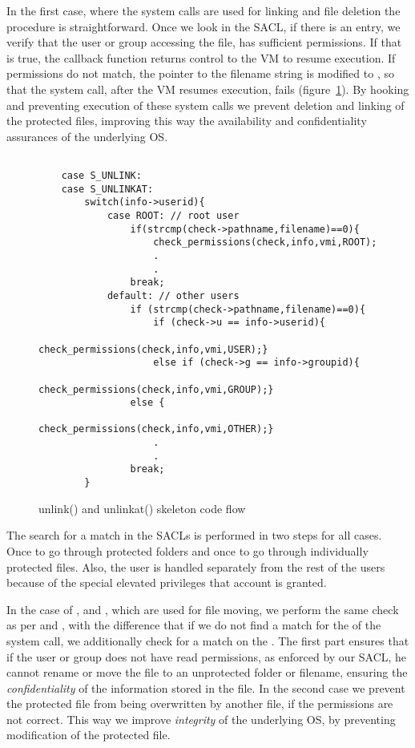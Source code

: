 \par In the first case, where the system calls are used for linking and file deletion the procedure is straightforward. Once we look in the \ac{SACL}, if there is an entry, we verify that the user or group accessing the file, has sufficient permissions. If that is true, the callback function returns control to the \ac{VM} to resume execution. If permissions do not match, the pointer to the filename string is modified to , so that the system call, after the \ac{VM} resumes execution, fails (figure~\ref{fig:unlink}). By hooking and preventing execution of these system calls we prevent deletion and linking of the protected files, improving this way the availability and confidentiality assurances of the underlying \ac{OS}.

\begin{figure}[ht]
\selectfont
\begin{lstlisting}[style=CStyle]

	case S_UNLINK:
	case S_UNLINKAT:
		switch(info->userid){
			case ROOT: // root user
				if(strcmp(check->pathname,filename)==0){
					check_permissions(check,info,vmi,ROOT);			
					.
					.
				break;
			default: // other users
				if (strcmp(check->pathname,filename)==0){
					if (check->u == info->userid){
						check_permissions(check,info,vmi,USER);}
					else if (check->g == info->groupid){
						check_permissions(check,info,vmi,GROUP);}
				else {
					check_permissions(check,info,vmi,OTHER);}
					.
					.
				break;
		}
\end{lstlisting}
	\caption{unlink() and unlinkat() skeleton code flow}
	\label{fig:unlink}
\end{figure}

\par The search for a match in the \ac{SACL}s is performed in two steps for all cases. Once to go through protected folders and once to go through individually protected files. Also, the  user is handled separately from the rest of the users because of the special elevated privileges that account is granted. 

\par In the case of ,  and , which are used for file moving, we perform the same check as per  and , with the difference that if we do not find a match for the  of the system call, we additionally check for a match on the . The first part ensures that if the user or group does not have read permissions, as enforced by our \ac{SACL}, he cannot rename or move the file to an unprotected folder or filename, ensuring the \emph{confidentiality} of the information stored in the file. In the second case we prevent the protected file from being overwritten by another file, if the permissions are not correct. This way we improve \emph{integrity} of the underlying \ac{OS}, by preventing modification of the protected file. 

